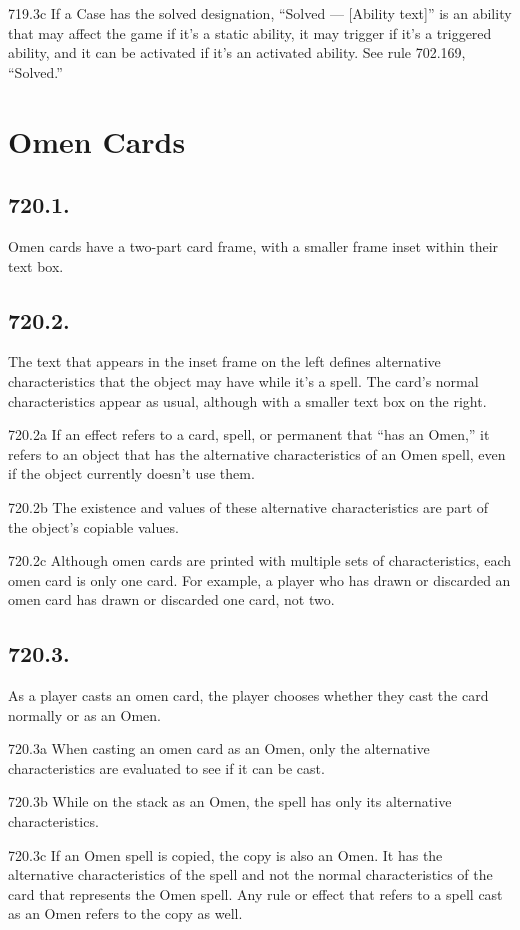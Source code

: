 719.3c If a Case has the solved designation, “Solved — [Ability text]” is an ability that may affect the game if it’s a static ability, it may trigger if it’s a triggered ability, and it can be activated if it’s an activated ability. See rule 702.169, “Solved.”

\section{Omen Cards}
\subsection*{720.1.}
Omen cards have a two-part card frame, with a smaller frame inset within their text box.

\subsection*{720.2.}
The text that appears in the inset frame on the left defines alternative characteristics that the object may have while it’s a spell. The card’s normal characteristics appear as usual, although with a smaller text box on the right.

720.2a If an effect refers to a card, spell, or permanent that “has an Omen,” it refers to an object that has the alternative characteristics of an Omen spell, even if the object currently doesn’t use them.

720.2b The existence and values of these alternative characteristics are part of the object’s copiable values.

720.2c Although omen cards are printed with multiple sets of characteristics, each omen card is only one card. For example, a player who has drawn or discarded an omen card has drawn or discarded one card, not two.

\subsection*{720.3.}
As a player casts an omen card, the player chooses whether they cast the card normally or as an Omen.

720.3a When casting an omen card as an Omen, only the alternative characteristics are evaluated to see if it can be cast.

720.3b While on the stack as an Omen, the spell has only its alternative characteristics.

720.3c If an Omen spell is copied, the copy is also an Omen. It has the alternative characteristics of the spell and not the normal characteristics of the card that represents the Omen spell. Any rule or effect that refers to a spell cast as an Omen refers to the copy as well.

